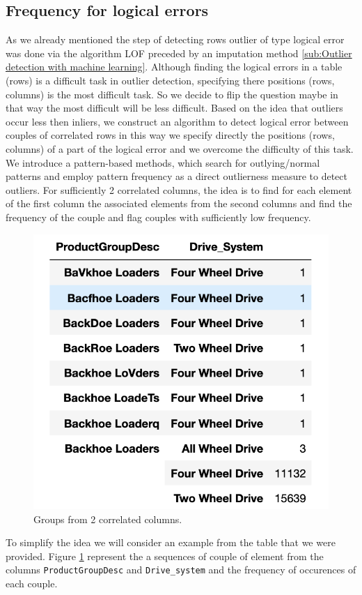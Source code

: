 \documentclass{article}
\begin{document}
\subsection{Frequency for logical errors} %
\label{sub:Frequency for logical errors}
As we already mentioned the step of detecting rows outlier of type logical error was done via the algorithm LOF preceded by an imputation method \ref{sub:Outlier detection with machine learning}.
Although finding the logical errors in a table (rows) is a difficult task in outlier detection, specifying there positions (rows, columns) is the most difficult task.
So we decide to flip the question maybe in that way the most difficult will be less difficult.
Based on the idea that outliers occur less then inliers, we construct an algorithm to detect logical error  between couples of correlated rows in this way we specify directly the positions (rows, columns) of a part of the logical error and we overcome the difficulty of this task.
We introduce a pattern-based methods, which search for outlying/normal patterns and employ pattern frequency as a direct outlierness measure to detect outliers.
For sufficiently 2 correlated columns, the idea is to find for each element of the first column the associated elements from the second columns and find the frequency of the couple and flag couples with sufficiently low frequency.
\begin{figure}[H]
    \centering
    \includegraphics[width=0.6\linewidth]{picture/logic_err.png}
    \caption{Groups from 2 correlated columns.}
    \label{fig:logic_err}
\end{figure}
To simplify the idea we will consider an example from the table that we were provided. Figure \ref{fig:logic_err} represent the a sequences of couple of element from the columns \texttt{ProductGroupDesc} and \texttt{Drive\_system} and the frequency of occurences of each couple.
\end{document}
